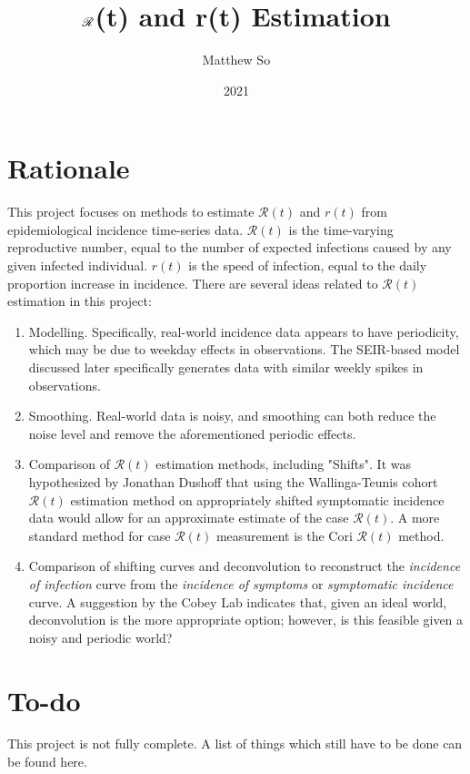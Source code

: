 \documentclass{article}
\title{$\nR$(t) and r(t) Estimation}
\author{Matthew So}
\date{2021}
\newcommand{\nR}{\mathscr{R}}
\begin{document}
\maketitle



\tableofcontents

\section{Rationale}
This project focuses on methods to estimate $\nR(t)$ and $r(t)$ from epidemiological incidence time-series data. $\nR(t)$ is the time-varying reproductive number, equal to the number of expected infections caused by any given infected individual. $r(t)$ is the speed of infection, equal to the daily proportion increase in incidence. There are several ideas related to $\nR(t)$ estimation in this project:

\begin{enumerate}
    \item Modelling. Specifically, real-world incidence data appears to have periodicity, which may be due to weekday effects in observations. The SEIR-based model discussed later specifically generates data with similar weekly spikes in observations.
    \item Smoothing. Real-world data is noisy, and smoothing can both reduce the noise level and remove the aforementioned periodic effects. 
    \item Comparison of $\nR(t)$ estimation methods, including "Shifts". It was hypothesized by Jonathan Dushoff that using the Wallinga-Teunis \cite{WallingaTeunis} cohort $\nR(t)$ estimation method on appropriately shifted symptomatic incidence data would allow for an approximate estimate of the case $\nR(t)$. A more standard method for case $\nR(t)$ measurement is the Cori $\nR(t)$ method.
    \item Comparison of shifting curves and deconvolution to reconstruct the \textit{incidence of infection} curve from the \textit{incidence of symptoms} or \textit{symptomatic incidence} curve. A suggestion by the Cobey Lab \cite{Gostic} indicates that, given an ideal world, deconvolution is the more appropriate option; however, is this feasible given a noisy and periodic world? 
\end{enumerate}

\section{To-do}
This project is not fully complete. A list of things which still have to be done can be found here.
\end{document}
